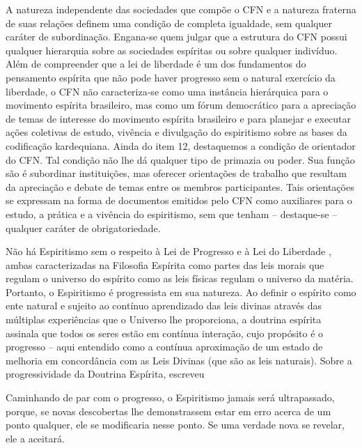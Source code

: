 A natureza independente das sociedades que compõe o CFN e a natureza fraterna de suas relações definem uma condição de completa igualdade, sem qualquer caráter de subordinação. 
Engana-se quem julgar que a estrutura do CFN possui qualquer hierarquia sobre as sociedades espíritas ou sobre qualquer indivíduo. Além de compreender que a lei de liberdade é um dos fundamentos do pensamento espírita que não pode haver progresso sem o natural exercício da liberdade, o CFN não caracteriza-se como uma instância hierárquica para o movimento espírita brasileiro, mas como um fórum democrático para a apreciação de temas de interesse do movimento espírita brasileiro e para planejar e executar ações coletivas de estudo, vivência e divulgação do espiritismo sobre as bases da codificação kardequiana. Ainda do item 12, destaquemos a condição de orientador do CFN. Tal condição não lhe dá qualquer tipo de primazia ou poder. Sua função são é subordinar instituições, mas oferecer orientações de trabalho que resultam da apreciação e debate de temas entre os membros participantes. Tais orientações se expressam na forma de documentos emitidos pelo CFN como auxiliares para o estudo, a prática e a vivência do espiritismo, sem que tenham -- destaque-se -- qualquer caráter de obrigatoriedade.

Não há Espiritismo sem o respeito à Lei de Progresso \cite[Parte III. Cap. VII ]{Kardec1857} e à Lei do Liberdade \cite[Parte III. Cap.X]{Kardec1857}, ambas caracterizadas na Filosofia Espírita como partes das leis morais que regulam o universo do espírito como as leis físicas regulam o universo da matéria. Portanto, o Espiritismo é progressista em sua natureza. Ao definir o espírito como ente natural e sujeito ao contínuo aprendizado das leis divinas através das múltiplas experiências que o Universo lhe proporciona, a doutrina espírita assinala que todos os seres estão em contínua interação, cujo propósito é o progresso -- aqui entendido como a contínua aproximação de um estado de melhoria em concordância com as Leis Divinas (que são as leis naturais). Sobre a progressividade da Doutrina Espírita, escreveu 

\begin{citacao}
	Caminhando de par com o progresso, o Espiritismo jamais será ultrapassado, porque, se novas descobertas lhe demonstrassem estar em erro acerca de um ponto qualquer, ele se modificaria nesse ponto. Se uma verdade nova se revelar, ele a aceitará.

\end{citacao}

